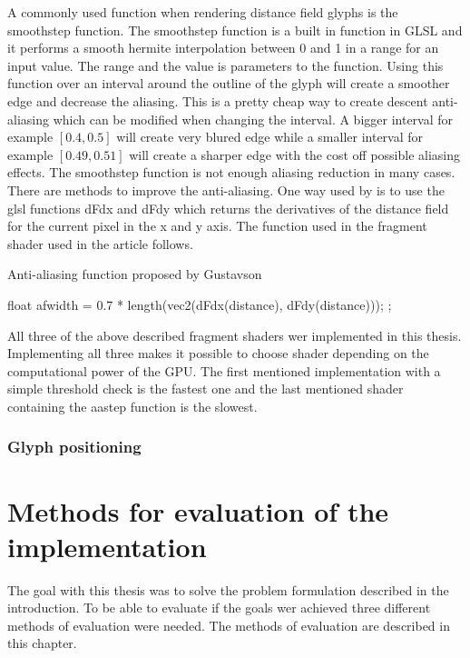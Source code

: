 A commonly used function when rendering distance field glyphs is the smoothstep function. The smoothstep function is a built in function in GLSL and it performs a smooth hermite interpolation between 0 and 1 in a range for an input value. The range and the value is parameters to the function. Using this function over an interval around the outline of the glyph will create a smoother edge and decrease the aliasing. This is a pretty cheap way to create descent anti-aliasing which can be modified when changing the interval. A bigger interval for example $[0.4,0.5]$ will create very blured edge while a smaller interval for example $[0.49,0.51]$ will create a sharper edge with the cost off possible aliasing effects. The smoothstep function is not enough aliasing reduction in many cases. There are methods to improve the anti-aliasing. One way used by \citet{gustavson20122d} is to use the glsl functions dFdx and dFdy which returns the derivatives of the distance field for the current pixel in the x and y axis. The function used in the fragment shader used in the article follows.
\begin{algorithm}[H]
\caption{Anti-aliasing function proposed by Gustavson}
\begin{algorithmic}
\State float afwidth = 0.7 * length(vec2(dFdx(distance), dFdy(distance)));
\State \Return {};
\EndProcedure
\end{algorithmic}
\end{algorithm}
All three of the above described fragment shaders wer implemented in this thesis. Implementing all three makes it possible to choose shader depending on the computational power of the GPU. The first mentioned implementation with a simple threshold check is the fastest one and the last mentioned shader containing the aastep function is the slowest.
\subsection{Glyph positioning}

\chapter{Methods for evaluation of the implementation}
The goal with this thesis was to solve the problem formulation described in the introduction. To be able to evaluate if the goals wer achieved three different methods of evaluation were needed. The methods of evaluation are described in this chapter.
